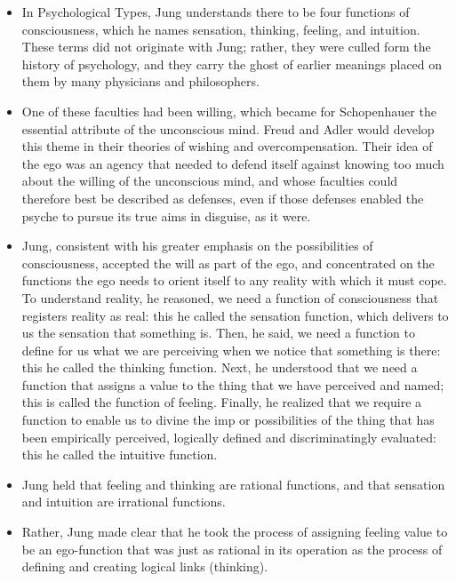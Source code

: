 \begin{itemize}

\item In Psychological Types, Jung understands there to be four functions of
consciousness, which he names sensation, thinking, feeling, and intuition.
These terms did not originate with Jung; rather, they were culled form the
history of psychology, and they carry the ghost of earlier meanings placed on
them by many physicians and philosophers.

\item One of these faculties had been willing, which became for Schopenhauer
the essential attribute of the unconscious mind. Freud and Adler would develop
this theme in their theories of wishing and overcompensation. Their idea of the
ego was an agency that needed to defend itself against knowing too much about
the willing of the unconscious mind, and whose faculties could therefore best
be described as defenses, even if those defenses enabled the psyche to pursue
its true aims in disguise, as it were.

\item Jung, consistent with his greater emphasis on the possibilities of
consciousness, accepted the will as part of the ego, and concentrated on the
functions the ego needs to orient itself to any reality with which it must
cope. To understand reality, he reasoned, we need a function of consciousness
that registers reality as real: this he called the sensation function, which
delivers to us the sensation that something is. Then, he said, we need a
function to define for us what we are perceiving when we notice that something
is there: this he called the thinking function. Next, he understood that we
need a function that assigns a value to the thing that we have perceived and
named; this is called the function of feeling. Finally, he realized that we
require a function to enable us to divine the imp or possibilities of the thing
that has been empirically perceived, logically defined and discriminatingly
evaluated: this he called the intuitive function.

\item Jung held that feeling and thinking are rational functions, and that
sensation and intuition are irrational functions.

\item Rather, Jung made clear that he took the process of assigning feeling
value to be an ego-function that was just as rational in its operation as the
process of defining and creating logical links (thinking).


\end{itemize}
